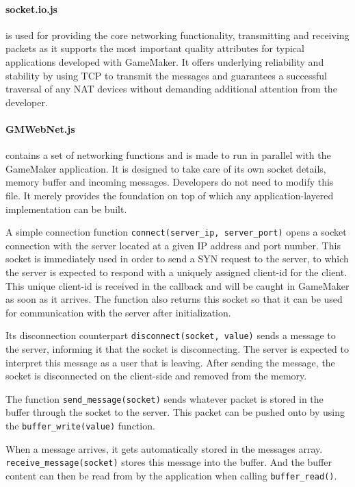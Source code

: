 \documentclass[bsc,frontabs,twoside,singlespacing,parskip,deptreport]{infthesis}     %
\begin{document}
\paragraph*{socket.io.js}
is used for providing the core networking functionality, transmitting and receiving packets as it supports the most important quality attributes for typical applications developed with GameMaker. It offers underlying reliability and stability by using TCP to transmit the messages and guarantees a successful traversal of any NAT devices without demanding additional attention from the developer.

\paragraph*{GMWebNet.js}
contains a set of networking functions and is made to run in parallel with the GameMaker application. 
It is designed to take care of its own socket details, memory buffer and incoming messages. Developers do not need to modify this file. It merely provides the foundation on top of which any application-layered implementation can be built.

A simple connection function \texttt{connect(server\_ip, server\_port)} opens a socket connection with the server located at a given IP address and port number.
This socket is immediately used in order to send a SYN request to the server, to which the server is expected to respond with a uniquely assigned client-id for the client. This unique client-id is received in the callback and will be caught in GameMaker as soon as it arrives.
The function also returns this socket so that it can be used for communication with the server after initialization.

Its disconnection counterpart \texttt{disconnect(socket, value)} sends a message to the server, informing it that the socket is disconnecting. The server is expected to interpret this message as a user that is leaving.
After sending the message, the socket is disconnected on the client-side and removed from the memory.

The function \texttt{send\_message(socket)} sends whatever packet is stored in the buffer through the socket to the server.
This packet can be pushed onto by using the \texttt{buffer\_write(value)} function.

When a message arrives, it gets automatically stored in the messages array. \texttt{receive\_message(socket)} stores this message into the buffer. And the buffer content can then be read from by the application when calling \texttt{buffer\_read()}.
\end{document}

